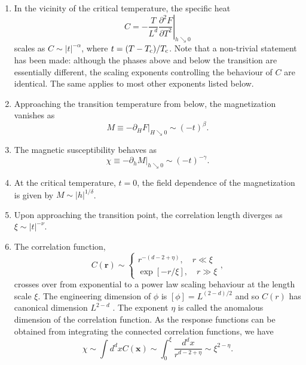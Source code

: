\begin{enumerate}
\item In the vicinity of the critical temperature, the specific heat
\[ C = \left. -\frac{T}{L^d} \frac{\partial^2 F }{\partial T^2} \right|_{h \searrow 0} \]
scales as $C \sim |t|^{-\alpha}$, where $t = (T-T_{\rm c})/T_{\rm c}$.
Note that a non-trivial statement has been made: 
although the phases above and below the transition are essentially different, the scaling exponents controlling the behaviour of $C$ are identical. 
The same applies to most other exponents listed below.
\item Approaching the transition temperature from below, the magnetization vanishes as
\[M \equiv -\left. \partial_H F \right|_{H \searrow 0} \sim (-t)^{\beta} .\]
\item The magnetic susceptibility behaves as
\[\chi \equiv -\left. \partial_h M \right|_{h \searrow 0} \sim (-t)^{-\gamma} .\]
\item At the critical temperature, $t = 0$, the field dependence of the magnetization is given by $M \sim |h|^{1/\delta}$.
\item Upon approaching the transition point, the correlation length diverges as $\xi \sim |t|^{-\nu}$.
\item The correlation function,
\[C(\bm{r}) \sim \begin{cases} r^{-(d-2+\eta)}, \quad r \ll \xi \\ \exp[-r/\xi] , \quad r \gg \xi  \end{cases} ,\]
crosses over from exponential to a power law scaling behaviour at the length scale $\xi$.
The engineering dimension of $\phi$ is $[\phi] = L^{(2-d)/2}$ and so $C(r)$ has canonical dimension $L^{2-d}$ . 
The exponent $\eta$ is called the anomalous dimension of the correlation function.
As the response functions can be obtained from integrating the connected correlation functions, we have
\begin{equation}
    \chi \sim \int d^dx C(\bm{x}) \sim \int_0^{\xi} \frac{d^dx}{r^{d-2+\eta}} \sim \xi^{2-\eta}.
\end{equation}
\end{enumerate}

